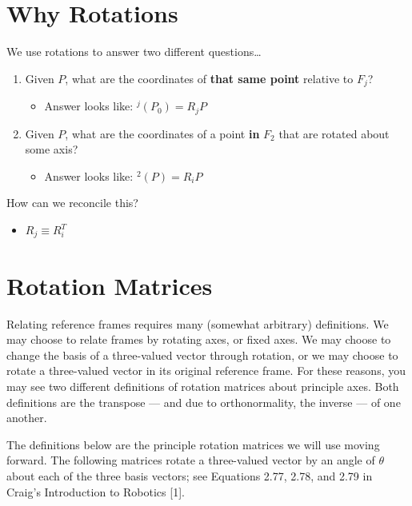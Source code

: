 \documentclass[
  letterpaper,
  DIV=11,
  numbers=noendperiod]{scrreprt}
\providecommand{\tightlist}{%
  \setlength{\itemsep}{0pt}\setlength{\parskip}{0pt}}\usepackage{longtable,booktabs,array}
\begin{document}
\hfill\break

\hypertarget{why-rotations}{%
\section{Why Rotations}\label{why-rotations}}

We use rotations to answer two different questions\ldots{}

\begin{enumerate}
\def\labelenumi{\arabic{enumi}.}
\tightlist
\item
  Given \(P\), what are the coordinates of \textbf{that same point}
  relative to \(F_j\)?

  \begin{itemize}
  \tightlist
  \item
    Answer looks like: \({}^j(P_0) = R_j P\)
  \end{itemize}
\item
  Given \(P\), what are the coordinates of a point \textbf{in} \(F_2\)
  that are rotated about some axis?

  \begin{itemize}
  \tightlist
  \item
    Answer looks like: \({}^2(P) = R_i P\)
  \end{itemize}
\end{enumerate}

How can we reconcile this?

\begin{itemize}
\tightlist
\item
  \(R_j \equiv R_i^T\)
\end{itemize}

\hypertarget{rotation-matrices}{%
\section{Rotation Matrices}\label{rotation-matrices}}

Relating reference frames requires many (somewhat arbitrary)
definitions. We may choose to relate frames by rotating axes, or fixed
axes. We may choose to change the basis of a three-valued vector through
rotation, or we may choose to rotate a three-valued vector in its
original reference frame. For these reasons, you may see two different
definitions of rotation matrices about principle axes. Both definitions
are the transpose --- and due to orthonormality, the inverse --- of one
another.

The definitions below are the principle rotation matrices we will use
moving forward. The following matrices rotate a three-valued vector by
an angle of \(\theta\) about each of the three basis vectors; see
Equations 2.77, 2.78, and 2.79 in Craig's Introduction to Robotics
{[}1{]}.
\end{document}
